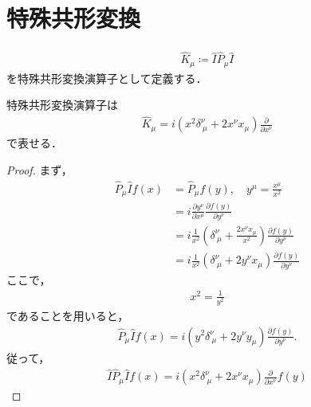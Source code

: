 \section{特殊共形変換}
\begin{defn}[特殊共形変換]
	\begin{align}
		\hat{K}_{\mu}\coloneqq{}\hat{I}\hat{P}_{\mu}\hat{I}
	\end{align}
	を特殊共形変換演算子として定義する．
\end{defn}
\begin{prop}
	特殊共形変換演算子は
	\begin{align}
		\hat{K}_{\mu}=i\left(x^{2}\delta^{\nu}_{\ \mu}+2x^{\nu}x_{\mu}\right)\frac{\partial{}}{\partial{}x^{\nu}}
	\end{align}
	で表せる．
\end{prop}
\begin{proof}
	まず，
	\begin{align}
		\hat{P}_{\mu}\hat{I}f(x) & =\hat{P}_{\mu}f(y),\quad{}y^{\mu}=\frac{x^{\mu}}{x^{2}}                                                                  \\
		                         & =i\frac{\partial{}y^{\nu}}{\partial{}x^{\mu}}\frac{\partial{}f(y)}{\partial{}y^{\nu}}                                    \\
		                         & =i\frac{1}{x^{2}}\left(\delta^{\nu}_{\ \mu}+\frac{2x^{\nu}x_{\mu}}{x^{2}}\right)\frac{\partial{}f(y)}{\partial{}y^{\nu}} \\
		                         & =i\frac{1}{x^{2}}\left(\delta^{\nu}_{\ \mu}+2y^{\nu}x_{\mu}\right)\frac{\partial{}f(y)}{\partial{}y^{\nu}}
	\end{align}
	ここで，
	\begin{align}
		x^{2}=\frac{1}{y^{2}}
	\end{align}
	であることを用いると，
	\begin{align}
		\hat{P}_{\mu}\hat{I}f(x)=i\left(y^{2}\delta^{\nu}_{\ \mu}+2y^{\nu}y_{\mu}\right)\frac{\partial{}f(y)}{\partial{}y^{\nu}}.
	\end{align}
	従って，
	\begin{align}
		\hat{I}\hat{P}_{\mu}\hat{I}f(x)=i\left(x^{2}\delta^{\nu}_{\ \mu}+2x^{\nu}x_{\mu}\right)\frac{\partial{}}{\partial{}x^{\nu}}f(y)
	\end{align}
\end{proof}
